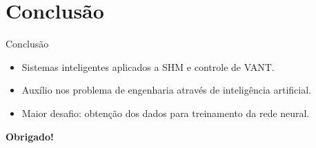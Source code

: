 \section{Conclusão}

\begin{frame}{Conclusão}
\begin{itemize}
    \item Sistemas inteligentes aplicados a SHM e controle de VANT.
    \item Auxílio nos problema de engenharia através de inteligência artificial.
    \item \alert{Maior desafio:} obtenção dos dados para treinamento da rede neural.
\end{itemize}
\end{frame}

{
\begin{frame}
    \centering
    {\sffamily\Huge\bfseries Obrigado!}
\end{frame}
}